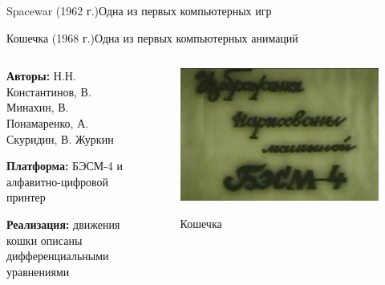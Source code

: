 \documentclass{beamer}
\begin{document}
\begin{frame}{Spacewar (1962 г.)}{Одна из первых компьютерных игр}
{		%
		
		
		
	}
	
	\end{frame}

\begin{frame}{Кошечка (1968 г.)}{Одна из первых компьютерных анимаций}
	
	\begin{columns}
		\begin{column}{0.5\textwidth}
			
			\textbf{Авторы:} Н.Н. Константинов, В. Минахин, В. Понамаренко, А. Скуридин, В. Журкин
			
			\textbf{Платформа:} БЭСМ-4 и алфавитно-цифровой принтер
			
			\textbf{Реализация:} движения кошки описаны дифференциальными уравнениями
			
		\end{column}
		\begin{column}{0.5\textwidth}
			\begin{figure}
				\href{https://www.youtube.com/watch?v=LzMk5sC6eAU}{
				\includegraphics[width=\textwidth]{images/AnimatedCat.jpg}
				}
				\caption {Кошечка}
			\end{figure}
		\end{column}
	\end{columns}
\end{frame}
\end{document}
